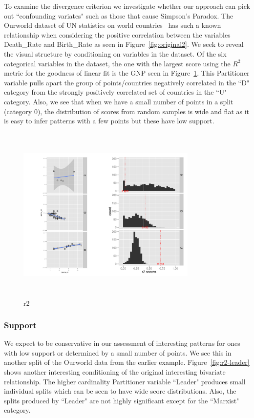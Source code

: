 To examine the divergence criterion we investigate whether our approach can pick out ``confounding variates" such as those that cause Simpson's Paradox. The Ourworld dataset of UN statistics on world countries~\cite{Wilkinson2005GG,Wilkinson2008} has such a known relationship when considering the positive correlation between the variables Death\_Rate and Birth\_Rate as seen in Figure~\ref{fig:original2}. We seek to reveal the visual structure by conditioning on variables in the dataset. Of the six categorical variables in the dataset, the one with the largest score using the $R^2$ metric for the goodness of linear fit is the GNP seen in Figure~\ref{fig:r2}. This Partitioner variable pulls apart the group of points/countries negatively correlated in the ``D" category from the strongly positively correlated set of countries in the ``U" category. Also, we see that when we have a small number of points in a split (category $0$), the distribution of scores from random samples is wide and flat as it is easy to infer patterns with a few points but these have low support.
\begin{figure}
\raggedleft
\includegraphics[width=3.5in,height=3.5in]{images/6_79024203387873-GNP.pdf}
  \caption{r2}
 \label{fig:r2}
\end{figure}

\subsubsection{Support}
We expect to be conservative in our assessment of interesting patterns for ones with low support or determined by a small number of points. We see this in another split of the Ourworld data from the earlier example. Figure~\ref{fig:r2-leader} shows another interesting conditioning of the original interesting bivariate relationship. The higher cardinality Partitioner variable ``Leader" produces small individual splits which can be seen to have wide score distributions. Also, the splits produced by ``Leader" are not highly significant except for the ``Marxist" category.

